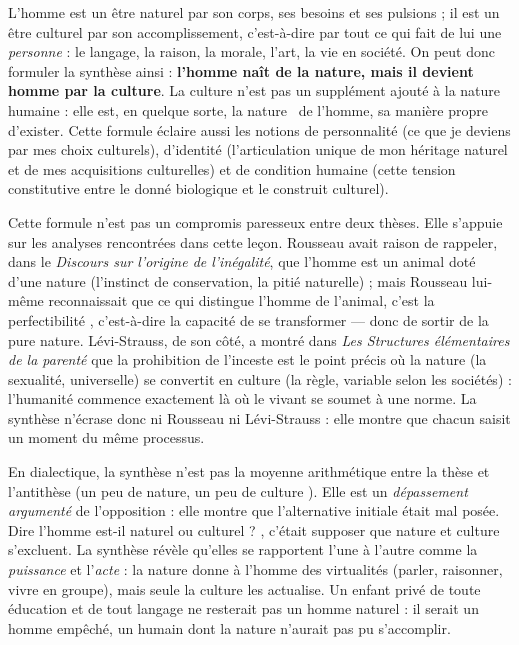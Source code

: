 \documentclass[11pt]{article}
\newcommand{\cle}[1]{{\popxbold\color{popdark}#1}}
\begin{document}
\begin{aretenir}
L'homme est un être \cle{naturel} par son corps, ses besoins et ses pulsions ; il est un être \cle{culturel} par son accomplissement, c'est-à-dire par tout ce qui fait de lui une \emph{personne} : le langage, la raison, la morale, l'art, la vie en société. On peut donc formuler la synthèse ainsi : \textbf{l'homme naît de la nature, mais il devient homme par la culture}. La culture n'est pas un supplément ajouté à la nature humaine : elle est, en quelque sorte, la \guillemotleft nature \guillemotright\ de l'homme, sa manière propre d'exister. Cette formule éclaire aussi les notions de \cle{personnalité} (ce que je deviens par mes choix culturels), d'\cle{identité} (l'articulation unique de mon héritage naturel et de mes acquisitions culturelles) et de \cle{condition humaine} (cette tension constitutive entre le donné biologique et le construit culturel).
\end{aretenir}

Cette formule n'est pas un compromis paresseux entre deux thèses. Elle s'appuie sur les analyses rencontrées dans cette leçon. Rousseau avait raison de rappeler, dans le \emph{Discours sur l'origine de l'inégalité}, que l'homme est un animal doté d'une nature (l'instinct de conservation, la pitié naturelle) ; mais Rousseau lui-même reconnaissait que ce qui distingue l'homme de l'animal, c'est la \guillemotleft perfectibilité \guillemotright, c'est-à-dire la capacité de se transformer — donc de sortir de la pure nature. Lévi-Strauss, de son côté, a montré dans \emph{Les Structures élémentaires de la parenté} que la prohibition de l'inceste est le point précis où la nature (la sexualité, universelle) se convertit en culture (la règle, variable selon les sociétés) : l'humanité commence exactement là où le vivant se soumet à une norme. La synthèse n'écrase donc ni Rousseau ni Lévi-Strauss : elle montre que chacun saisit un moment du même processus.

\begin{propriete}
En dialectique, la \cle{synthèse} n'est pas la moyenne arithmétique entre la thèse et l'antithèse (\guillemotleft un peu de nature, un peu de culture \guillemotright). Elle est un \emph{dépassement argumenté} de l'opposition : elle montre que l'alternative initiale était mal posée. Dire \guillemotleft l'homme est-il naturel ou culturel ? \guillemotright, c'était supposer que nature et culture s'excluent. La synthèse révèle qu'elles se rapportent l'une à l'autre comme la \emph{puissance} et l'\emph{acte} : la nature donne à l'homme des virtualités (parler, raisonner, vivre en groupe), mais seule la culture les actualise. Un enfant privé de toute éducation et de tout langage ne resterait pas un \guillemotleft homme naturel \guillemotright : il serait un homme empêché, un humain dont la nature n'aurait pas pu s'accomplir.
\end{propriete}
\end{document}

